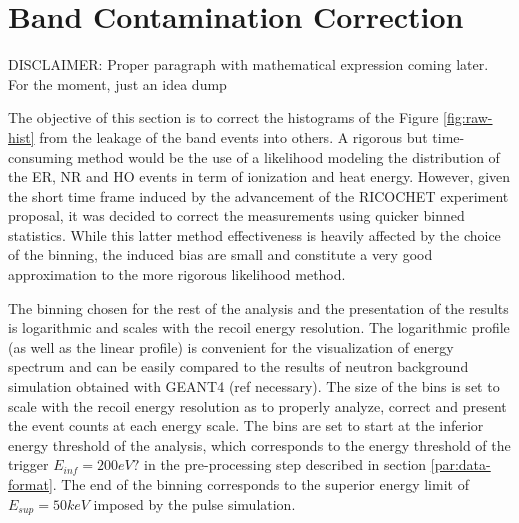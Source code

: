 \section{Band Contamination Correction}

{\color{red} DISCLAIMER: Proper paragraph with mathematical expression coming later. For the moment, just an idea dump}

The objective of this section is to correct the histograms of the Figure \ref{fig:raw-hist} from the leakage of the band events into others. A rigorous but time-consuming method would be the use of a likelihood modeling the distribution of the ER, NR and HO events in term of ionization and heat energy. However, given the short time frame induced by the advancement of the RICOCHET experiment proposal, it was decided to correct the measurements using quicker binned statistics. While this latter method effectiveness is heavily affected by the choice of the binning, the induced bias are small and constitute a very good approximation to the more rigorous likelihood method.

The binning chosen for the rest of the analysis and the presentation of the results is logarithmic and scales with the recoil energy resolution. The logarithmic profile (as well as the linear profile) is convenient for the visualization of energy spectrum and can be easily compared to the results of neutron background simulation obtained with GEANT4 (ref necessary). The size of the bins is set to scale with the recoil energy resolution as to properly analyze, correct and present the event counts at each energy scale.
The bins are set to start at the inferior energy threshold of the analysis, which corresponds to the energy threshold of the trigger $E_{inf}=200eV?$ in the pre-processing step described in section \ref{par:data-format}. The end of the binning corresponds to the superior energy limit of $E_{sup}=50keV$ imposed by the pulse simulation.

